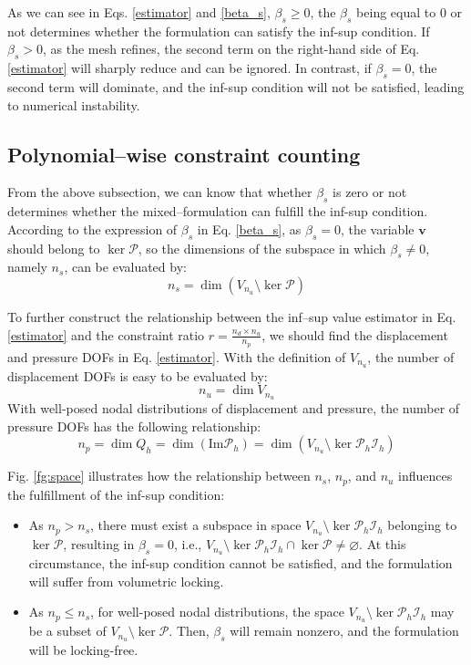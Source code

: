 As we can see in Eqs. \eqref{estimator} and \eqref{beta_s}, $\beta_s \ge 0$, the $\beta_s$ being equal to $0$ or not determines whether the formulation can satisfy the inf-sup condition. If $\beta_s > 0$, as the mesh refines, the second term on the right-hand side of Eq. \eqref{estimator} will sharply reduce and can be ignored. In contrast, if $\beta_s = 0$, the second term will dominate, and the inf-sup condition will not be satisfied, leading to numerical instability.

\subsection{Polynomial--wise constraint counting}

From the above subsection, we can know that whether $\beta_s$ is zero or not determines whether the mixed--formulation can fulfill the inf-sup condition. According to the expression of $\beta_s$ in Eq. \eqref{beta_s}, as $\beta_s = 0$, the variable $\boldsymbol{v}$ should belong to $\ker \mathcal{P}$, so the dimensions of the subspace in which $\beta_s \ne 0$, namely $n_s$, can be evaluated by:
\begin{equation}
n_s = \dim(V_{n_u} \setminus \ker \mathcal{P})
\end{equation}

To further construct the relationship between the inf--sup value estimator in Eq. \eqref{estimator} and the constraint ratio $r = \frac{n_d \times n_u}{n_p}$, we should find the displacement and pressure DOFs in Eq. \eqref{estimator}. With the definition of $V_{n_u}$, the number of displacement DOFs is easy to be evaluated by:
\begin{equation}
n_u = \dim V_{n_u}
\end{equation}
With well-posed nodal distributions of displacement and pressure, the number of pressure DOFs has the following relationship:
\begin{equation}
n_p = \dim Q_h = \dim (\mathrm{Im} \mathcal{P}_h) = \dim (V_{n_u} \setminus \ker \mathcal{P}_h \mathcal{I}_h)
\end{equation}

Fig. \ref{fg:space} illustrates how the relationship between $n_s$, $n_p$, and $n_u$ influences the fulfillment of the inf-sup condition:
\begin{itemize}
\item As $n_p > n_s$, there must exist a subspace in space $V_{n_u} \setminus \ker \mathcal{P}_h \mathcal{I}_h$ belonging to $\ker \mathcal{P}$, resulting in $\beta_s = 0$, i.e., $V_{n_u} \setminus \ker \mathcal{P}_h \mathcal{I}_h \cap \ker \mathcal{P} \neq \varnothing$. At this circumstance, the inf-sup condition cannot be satisfied, and the formulation will suffer from volumetric locking.

\item As $n_p \le n_s$, for well-posed nodal distributions, the space $V_{n_u} \setminus \ker \mathcal{P}_h \mathcal{I}_h$ may be a subset of $V_{n_u} \setminus \ker \mathcal{P}$. Then, $\beta_s$ will remain nonzero, and the formulation will be locking-free.
\end{itemize}


